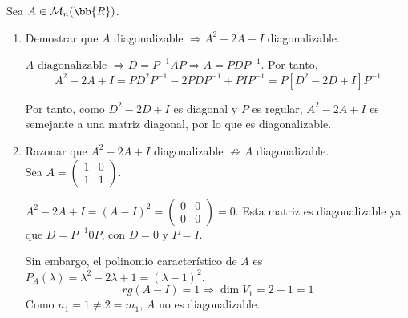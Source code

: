\begin{ejercicio}
    Sea $A\in \mathcal{M}_n(\bb{R})$.
    \begin{enumerate}
        \item Demostrar que  $A$ diagonalizable $\Longrightarrow A^2-2A+I$ diagonalizable.

        $A \text{ diagonalizable } \Longrightarrow D = P^{-1}AP \Longrightarrow A=PDP^{-1}$. Por tanto,
        $$A^2-2A+I = PD^2P^{-1} -2PDP^{-1} + PIP^{-1} = P[D^2-2D + I]P^{-1}$$

        Por tanto, como $D^2-2D + I$ es diagonal y $P$ es regular, $A^2-2A+I$ es semejante a una matriz diagonal, por lo que es diagonalizable.

        \item Razonar que  $A^2-2A+I$ diagonalizable $\nRightarrow A$ diagonalizable.\\

        Sea $A=\left( \begin{array}{cc}
            1 & 0 \\
            1 & 1
        \end{array}\right)$.

        $A^2-2A + I = (A-I)^2 =\left( \begin{array}{cc}
            0 & 0 \\
            0 & 0
        \end{array}\right) = 0$. Esta matriz es diagonalizable ya que $D=P^{-1}0P$, con $D=0$ y $P=I$.

        Sin embargo, el polinomio característico de $A$ es $P_A(\lambda) = \lambda^2-2\lambda + 1 = (\lambda-1)^2$.
        $$rg(A-I) = 1 \Longrightarrow \dim V_1 = 2-1 = 1$$
        Como $n_1 = 1 \neq 2 = m_1$, $A$ no es diagonalizable.
    \end{enumerate}
\end{ejercicio}

